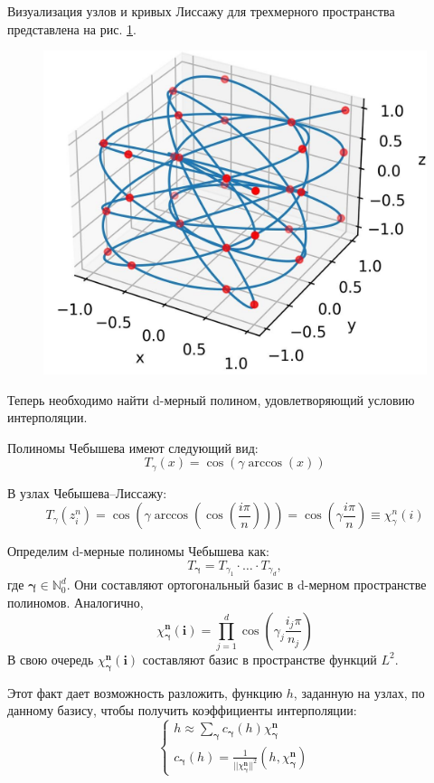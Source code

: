 Визуализация узлов и кривых Лиссажу для трехмерного пространства представлена на рис. \ref{fig:chebLis}.

\begin{figure}[h!]
    \centering
    \includegraphics[width=0.5\linewidth]{../images/solution/chebLis.png}
    \label{fig:chebLis}
\end{figure}

Теперь необходимо найти d-мерный полином, удовлетворяющий условию интерполяции.

Полиномы Чебышева имеют следующий вид:
\begin{equation*}
    T_{\gamma} (x) = \cos (\gamma \arccos (x))
\end{equation*}

В узлах Чебышева--Лиссажу:
\begin{equation*}
    T_{\gamma} (z^n_i) = \cos \left(\gamma \arccos \left(\cos \left(\frac{i \pi}{n}\right) \right)\right)
     = \cos(\gamma \frac{i \pi}{n}) \equiv \chi_{\gamma}^n (i)
\end{equation*}

Определим d-мерные полиномы Чебышева как:
\begin{equation*}
    T_{\mathbf{\gamma}} = T_{\gamma_1} \cdot \dots \cdot T_{\gamma_d},
\end{equation*}
где $\mathbf{\gamma} \in \mathbb{N}^d_0$.
Они составляют ортогональный базис в d-мерном пространстве полиномов. Аналогично,
\begin{equation*}
    \chi_{\mathbf{\gamma}}^{\mathbf{n}} (\mathbf{i}) = \prod_{j=1}^{d} \cos(\gamma_j \frac{i_j \pi}{n_j})
\end{equation*}
В свою очередь $\chi_{\mathbf{\gamma}}^{\mathbf{n}} (\mathbf{i})$ составляют базис в пространстве
функций $L^2$.

Этот факт дает возможность разложить, функцию $h$, заданную на узлах, по данному базису, чтобы
получить коэффициенты интерполяции:
\begin{equation*}
    \begin{cases*}
        h \approx \sum_{\mathbf{\gamma}} c_{\mathbf{\gamma}} (h) \chi_{\mathbf{\gamma}}^{\mathbf{n}} \\
        c_{\mathbf{\gamma}} (h) = \frac{1}{|| \chi_{\mathbf{\gamma}}^{\mathbf{n}} ||^2}
        \left(h, \chi_{\mathbf{\gamma}}^{\mathbf{n}}\right)
    \end{cases*}
\end{equation*}

